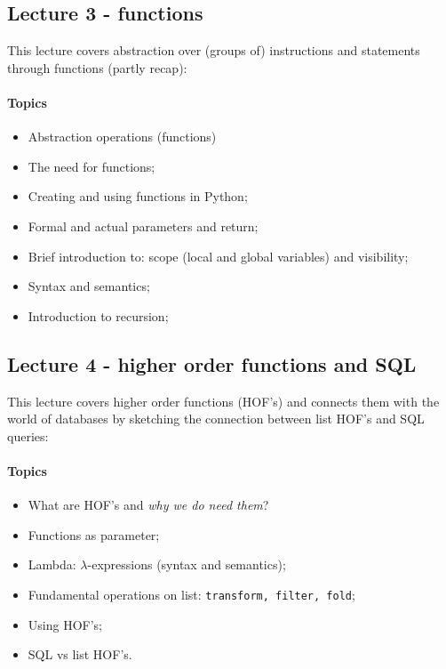 			\subsection{Lecture 3 - functions}
				This lecture covers abstraction over (groups of) instructions and statements through functions (partly recap):

				\paragraph*{Topics}
				\begin{itemize}
					\item Abstraction operations (functions)
					\item The need for functions;
					\item Creating and using functions in Python;
					\item Formal and actual parameters and return;
					\item Brief introduction to: scope (local and global variables) and visibility;
					\item Syntax and semantics;
					\item Introduction to recursion;
				\end{itemize}
				

			\subsection{Lecture 4 - higher order functions and SQL}
				This lecture covers higher order functions (HOF's) and connects them with the world of databases by sketching the connection between list HOF's and SQL queries:

				\paragraph*{Topics}
					\begin{itemize}
						\item What are HOF's and \textit{why we do need them}?
						\item Functions as parameter;
						\item Lambda: $\lambda$-expressions (syntax and semantics);
						\item Fundamental operations on list: \texttt{transform, filter, fold};
						\item Using HOF's;
						\item SQL vs list HOF's.
					\end{itemize}

